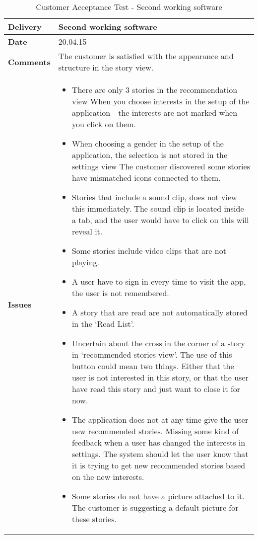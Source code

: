 \renewcommand{\arraystretch}{2}%
\begin{center}
	\begin{longtable}{ | p{4cm} | p{13cm} | }
		
		\caption[Customer Acceptance test]{Customer Acceptance Test - Second working software} \label{Tab:cattest4}\\
		\hline
		\textbf{Delivery} & Second working software\\ \hline
		\textbf{Date} & 20.04.15\\ \hline
		\textbf{Comments} & The customer is satisfied with the appearance and structure in the story view. 
		\\ \hline
		\textbf{Issues} & 
		\begin{itemize}[noitemsep]
			
			\item There are only 3 stories in the recommendation view 
			When you choose interests in the setup of the application - the interests are not marked when you click on them. \newline
			\item When choosing a gender in the setup of the application, the selection is not stored in the settings view
			The customer discovered some stories have mismatched icons connected to them. \newline
			\item Stories that include a sound clip, does not view this immediately. The sound clip is located inside a tab, and the user would have to click on this will reveal it. \newline
			\item  Some stories include video clips that are not playing.  \newline
			\item  A user have to sign in every time to visit the app, the user is not remembered. \newline
			\item  A story that are read are not automatically stored in the ‘Read List’. \newline
			\item  Uncertain about the cross in the corner of a story in ‘recommended stories view’. The use of this button could mean two things. Either that the user is not interested in this story, or that the user have read this story and just want to close it for now. \newline
			\item  The application does not at any time give the user new recommended stories. \newline
			Missing some kind of feedback when a user has changed the interests in settings. The system should let the user know that it is trying to get new recommended stories based on the new interests. \newline
			\item Some stories do not have a picture attached to it. The customer is suggesting a default picture for these stories.
		\end{itemize}
		\\ \hline 
		

\end{longtable}
\end{center}
